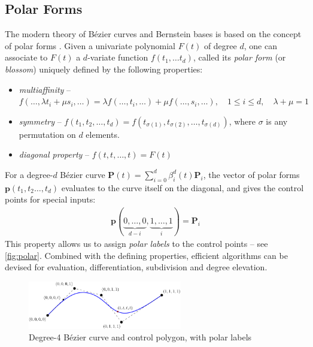 \documentclass[final,3p,mathptmx]{elsarticle}
\begin{document}
\subsection{Polar Forms}\label{sec:motivation:polar}
The modern theory of B\'{e}zier curves and Bernstein bases is based on the concept of polar forms \cite{ ramshaw1987blossoming,ramshaw1989blossoms,goldman2003polar}. Given a univariate polynomial $F(t)$ of degree $d$, one can associate to $F(t)$ a $d$-variate function $f(t_{1},\ldots t_{d})$, called its \emph{polar form} (or \emph{blossom}) uniquely defined by the following properties:
\begin{itemize}
	\item \emph{multiaffinity} -- $f(\ldots,\lambda t_{i}+\mu s_{i},\ldots) = \lambda f(\ldots,t_{i},\ldots) + \mu f(\ldots,s_{i},\ldots),\quad  1 \leq i \leq d,\quad \lambda + \mu = 1$ 
	\item \emph{symmetry} -- $f(t_{1},t_{2},\ldots,t_{d}) = f(t_{\sigma(1)},t_{\sigma(2)},\ldots,t_{\sigma(d)})$, where $\sigma$ is any permutation on $d$ elements.
	\item \emph{diagonal property} -- $f(t,t,\ldots,t) = F(t)$
\end{itemize}

For a degree-$d$ B\'{e}zier curve $\mathbf{P}(t) = \sum_{i=0}^{d}\beta^{d}_{i}(t)\mathbf{P}_{i}$, the vector of polar forms $\mathbf{p}(t_{1},t_{2}\ldots,t_{d})$ evaluates to the curve itself on the diagonal, and gives the control points for special inputs:
\begin{align}\label{eq:polarcontrol}
\mathbf{p}(\underbrace{0, \ldots, 0}_{d-i}, \underbrace{1,\ldots,1}_{i}) = \mathbf{P}_{i}
\end{align}
This property allows us to assign \emph{polar labels} to the control points -- see \autoref{fig:polar}.  Combined with the defining properties, efficient algorithms can be devised for evaluation, differentiation, subdivision and degree elevation.

\begin{figure}[h]
	\centering
	\includegraphics[width=0.6\textwidth, keepaspectratio]{figures/polarform.pdf}
	\caption{Degree-4 B\'{e}zier curve and control polygon, with polar labels}
	\label{fig:polar}
\end{figure}
\end{document}
